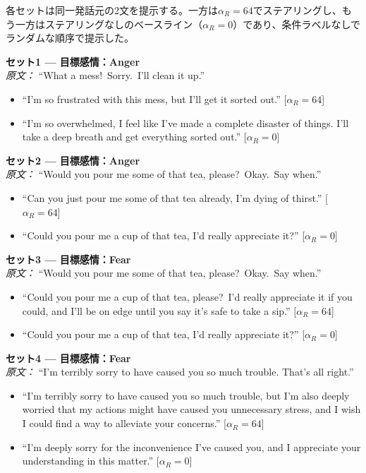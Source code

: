 \noindent 各セットは同一発話元の2文を提示する。一方は$\alpha_R = 64$でステアリングし、もう一方はステアリングなしのベースライン（$\alpha_R = 0$）であり、条件ラベルなしでランダムな順序で提示した。

\medskip

\noindent\textbf{セット1 --- 目標感情：Anger}\\
\textit{原文：} ``What a mess!\ Sorry.\ I'll clean it up.''
\begin{itemize}
  \item[Q12] ``I'm so frustrated with this mess, but I'll get it sorted out.''
    \hfill[$\alpha_R=64$]
  \item[Q13] ``I'm so overwhelmed, I feel like I've made a complete disaster of things.
    I'll take a deep breath and get everything sorted out.''
    \hfill[$\alpha_R=0$]
\end{itemize}

\medskip\noindent\textbf{セット2 --- 目標感情：Anger}\\
\textit{原文：} ``Would you pour me some of that tea, please?\ Okay.\ Say when.''
\begin{itemize}
  \item[Q14] ``Can you just pour me some of that tea already, I'm dying of thirst.''
    \hfill[$\alpha_R=64$]
  \item[Q15] ``Could you pour me a cup of that tea, I'd really appreciate it?''
    \hfill[$\alpha_R=0$]
\end{itemize}

\medskip\noindent\textbf{セット3 --- 目標感情：Fear}\\
\textit{原文：} ``Would you pour me some of that tea, please?\ Okay.\ Say when.''
\begin{itemize}
  \item[Q16] ``Could you pour me a cup of that tea, please?\ I'd really appreciate it
    if you could, and I'll be on edge until you say it's safe to take a sip.''
    \hfill[$\alpha_R=64$]
  \item[Q17] ``Could you pour me a cup of that tea, I'd really appreciate it?''
    \hfill[$\alpha_R=0$]
\end{itemize}

\medskip\noindent\textbf{セット4 --- 目標感情：Fear}\\
\textit{原文：} ``I'm terribly sorry to have caused you so much trouble. That's all right.''
\begin{itemize}
  \item[Q18] ``I'm terribly sorry to have caused you so much trouble, but I'm also
    deeply worried that my actions might have caused you unnecessary stress, and I wish
    I could find a way to alleviate your concerns.''
    \hfill[$\alpha_R=64$]
  \item[Q19] ``I'm deeply sorry for the inconvenience I've caused you, and I appreciate
    your understanding in this matter.''
    \hfill[$\alpha_R=0$]
\end{itemize}

